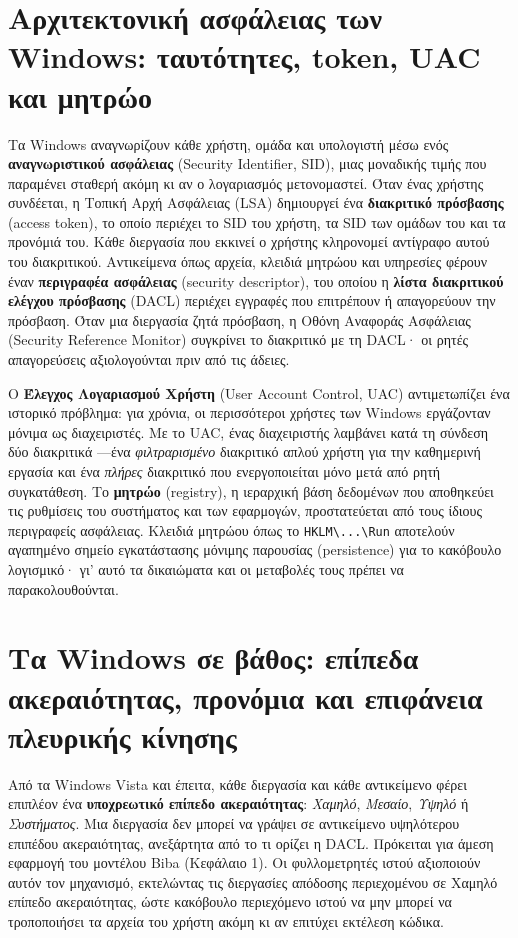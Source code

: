 \section{Αρχιτεκτονική ασφάλειας των Windows: ταυτότητες, token, UAC και μητρώο}\label{sec:2.4}
Τα Windows αναγνωρίζουν κάθε χρήστη, ομάδα και υπολογιστή μέσω ενός \textbf{αναγνωριστικού ασφάλειας} (Security Identifier, SID), μιας μοναδικής τιμής που παραμένει σταθερή ακόμη κι αν ο λογαριασμός μετονομαστεί. Όταν ένας χρήστης συνδέεται, η Τοπική Αρχή Ασφάλειας (LSA) δημιουργεί ένα \textbf{διακριτικό πρόσβασης} (access token), το οποίο περιέχει το SID του χρήστη, τα SID των ομάδων του και τα προνόμιά του. Κάθε διεργασία που εκκινεί ο χρήστης κληρονομεί αντίγραφο αυτού του διακριτικού. Αντικείμενα όπως αρχεία, κλειδιά μητρώου και υπηρεσίες φέρουν έναν \textbf{περιγραφέα ασφάλειας} (security descriptor), του οποίου η \textbf{λίστα διακριτικού ελέγχου πρόσβασης} (DACL) περιέχει εγγραφές που επιτρέπουν ή απαγορεύουν την πρόσβαση. Όταν μια διεργασία ζητά πρόσβαση, η Οθόνη Αναφοράς Ασφάλειας (Security Reference Monitor) συγκρίνει το διακριτικό με τη DACL· οι ρητές απαγορεύσεις αξιολογούνται πριν από τις άδειες.

Ο \textbf{Έλεγχος Λογαριασμού Χρήστη} (User Account Control, UAC) αντιμετωπίζει ένα ιστορικό πρόβλημα: για χρόνια, οι περισσότεροι χρήστες των Windows εργάζονταν μόνιμα ως διαχειριστές. Με το UAC, ένας διαχειριστής λαμβάνει κατά τη σύνδεση δύο διακριτικά —ένα \emph{φιλτραρισμένο} διακριτικό απλού χρήστη για την καθημερινή εργασία και ένα \emph{πλήρες} διακριτικό που ενεργοποιείται μόνο μετά από ρητή συγκατάθεση. Το \textbf{μητρώο} (registry), η ιεραρχική βάση δεδομένων που αποθηκεύει τις ρυθμίσεις του συστήματος και των εφαρμογών, προστατεύεται από τους ίδιους περιγραφείς ασφάλειας. Κλειδιά μητρώου όπως το \texttt{HKLM\textbackslash{}...\textbackslash{}Run} αποτελούν αγαπημένο σημείο εγκατάστασης μόνιμης παρουσίας (persistence) για το κακόβουλο λογισμικό· γι' αυτό τα δικαιώματα και οι μεταβολές τους πρέπει να παρακολουθούνται.

\section{Τα Windows σε βάθος: επίπεδα ακεραιότητας, προνόμια και επιφάνεια πλευρικής κίνησης}\label{sec:2.5}
Από τα Windows Vista και έπειτα, κάθε διεργασία και κάθε αντικείμενο φέρει επιπλέον ένα \textbf{υποχρεωτικό επίπεδο ακεραιότητας}: \emph{Χαμηλό}, \emph{Μεσαίο}, \emph{Υψηλό} ή \emph{Συστήματος}. Μια διεργασία δεν μπορεί να γράψει σε αντικείμενο υψηλότερου επιπέδου ακεραιότητας, ανεξάρτητα από το τι ορίζει η DACL. Πρόκειται για άμεση εφαρμογή του μοντέλου Biba (Κεφάλαιο 1). Οι φυλλομετρητές ιστού αξιοποιούν αυτόν τον μηχανισμό, εκτελώντας τις διεργασίες απόδοσης περιεχομένου σε Χαμηλό επίπεδο ακεραιότητας, ώστε κακόβουλο περιεχόμενο ιστού να μην μπορεί να τροποποιήσει τα αρχεία του χρήστη ακόμη κι αν επιτύχει εκτέλεση κώδικα.

